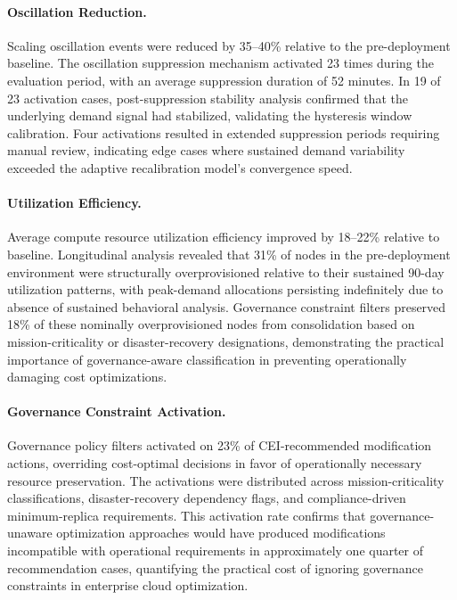 \documentclass[runningheads]{llncs}
\begin{document}
\paragraph{Oscillation Reduction.} Scaling oscillation events were reduced by 35--40\% relative to the pre-deployment baseline. The oscillation suppression mechanism activated 23 times during the evaluation period, with an average suppression duration of 52 minutes. In 19 of 23 activation cases, post-suppression stability analysis confirmed that the underlying demand signal had stabilized, validating the hysteresis window calibration. Four activations resulted in extended suppression periods requiring manual review, indicating edge cases where sustained demand variability exceeded the adaptive recalibration model's convergence speed.

\paragraph{Utilization Efficiency.} Average compute resource utilization efficiency improved by 18--22\% relative to baseline. Longitudinal analysis revealed that 31\% of nodes in the pre-deployment environment were structurally overprovisioned relative to their sustained 90-day utilization patterns, with peak-demand allocations persisting indefinitely due to absence of sustained behavioral analysis. Governance constraint filters preserved 18\% of these nominally overprovisioned nodes from consolidation based on mission-criticality or disaster-recovery designations, demonstrating the practical importance of governance-aware classification in preventing operationally damaging cost optimizations.

\paragraph{Governance Constraint Activation.} Governance policy filters activated on 23\% of CEI-recommended modification actions, overriding cost-optimal decisions in favor of operationally necessary resource preservation. The activations were distributed across mission-criticality classifications, disaster-recovery dependency flags, and compliance-driven minimum-replica requirements. This activation rate confirms that governance-unaware optimization approaches would have produced modifications incompatible with operational requirements in approximately one quarter of recommendation cases, quantifying the practical cost of ignoring governance constraints in enterprise cloud optimization.
\end{document}
